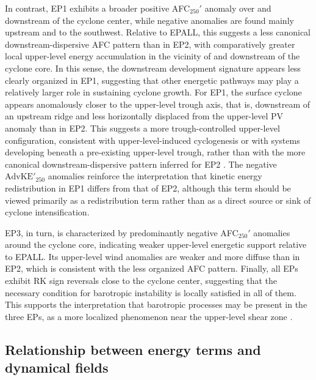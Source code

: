\documentclass[pdflatex,sn-chicago]{sn-jnl}%
\theoremstyle{plain}
\theoremstyle{definition}
\theoremstyle{remark}
\theoremstyle{definition}
\begin{document}
In contrast, EP1 exhibits a broader positive AFC$_{250}'$ anomaly over and downstream of the cyclone center, while negative anomalies are found mainly upstream and to the southwest. Relative to EPALL, this suggests a less canonical downstream-dispersive AFC pattern than in EP2, with comparatively greater local upper-level energy accumulation in the vicinity of and downstream of the cyclone core. In this sense, the downstream development signature appears less clearly organized in EP1, suggesting that other energetic pathways may play a relatively larger role in sustaining cyclone growth. For EP1, the surface cyclone appears anomalously closer to the upper-level trough axis, that is, downstream of an upstream ridge and less horizontally displaced from the upper-level PV anomaly than in EP2. This suggests a more trough-controlled upper-level configuration, consistent with upper-level-induced cyclogenesis or with systems developing beneath a pre-existing upper-level trough, rather than with the more canonical downstream-dispersive pattern inferred for EP2 \citep{schultz2019extratropical,sinclair2000classification,graf2017objective}.
 The negative $\mathrm{AdvKE'}_{250}$ anomalies reinforce the interpretation that kinetic energy redistribution in EP1 differs from that of EP2, although this term should be viewed primarily as a redistribution term rather than as a direct source or sink of cyclone intensification.

EP3, in turn, is characterized by predominantly negative AFC$_{250}'$ anomalies around the cyclone core, indicating weaker upper-level energetic support relative to EPALL. Its upper-level wind anomalies are weaker and more diffuse than in EP2, which is consistent with the less organized AFC pattern. Finally, all EPs exhibit RK sign reversals close to the cyclone center, suggesting that the necessary condition for barotropic instability is locally satisfied in all of them. This supports the interpretation that barotropic processes may be present in the three EPs, as a more localized phenomenon near the upper-level shear zone \citep[e.g.][]{mak1989local,wernli1998effect,cai2004local,riviere2006role}.

\subsection{Relationship between energy terms and dynamical fields}\label{sec:correlation}
\end{document}
